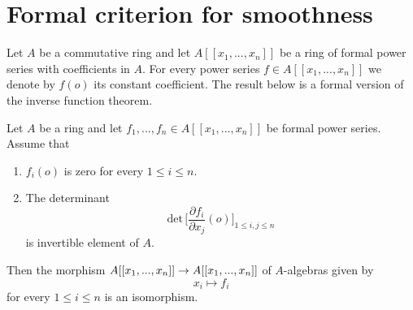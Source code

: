 \section{Formal criterion for smoothness}
\noindent
Let $A$ be a commutative ring and let $A[[x_1,...,x_n]]$ be a ring of formal power series with coefficients in $A$. For every power series $f\in A[[x_1,...,x_n]]$ we denote by $f(o)$ its constant coefficient. The result below is a formal version of the inverse function theorem.

\begin{theorem}\label{theorem:formal_inverse_function_theorem}
Let $A$ be a ring and let $f_1,...,f_n \in A[[x_1,...,x_n]]$ be formal power series. Assume that
\begin{enumerate}[label=\emph{\textbf{(\arabic*)}}, leftmargin=3.0em]
\item $f_i(o)$ is zero for every $1\leq i\leq n$.
\item The determinant
$$\mathrm{det}\,\bigg[\frac{\partial f_i}{\partial x_j}(o)\bigg]_{1\leq i,j\leq n}$$
is invertible element of $A$.
\end{enumerate}
Then the morphism $A[[x_1,...,x_n]]\rightarrow A[[x_1,...,x_n]]$ of $A$-algebras given by
$$x_i \mapsto f_i$$
for every $1\leq i \leq n$ is an isomorphism.
\end{theorem}
